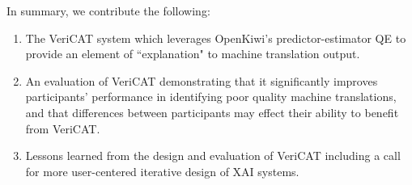 In summary, we contribute the following: 
\begin{enumerate}
    \item The VeriCAT system which leverages OpenKiwi’s predictor-estimator QE to provide an element of ``explanation" to machine translation output. 
    \item An evaluation of VeriCAT demonstrating that it significantly improves participants' performance in identifying poor quality machine translations, and that differences between participants may effect their ability to benefit from VeriCAT.
    \item Lessons learned from the design and evaluation of VeriCAT including a call for more user-centered iterative design of XAI systems. 
\end{enumerate}
